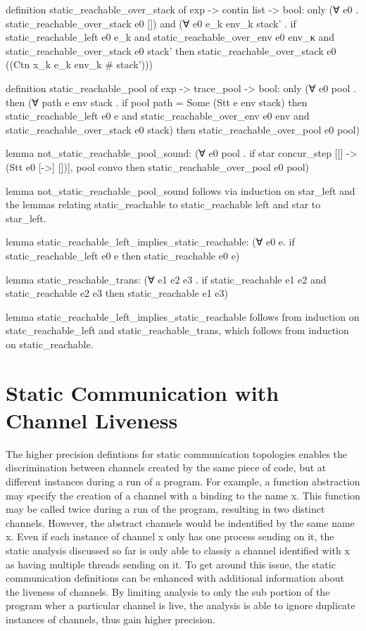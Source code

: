 definition static_reachable_over_stack of exp -> contin list -> bool:
only
(∀ e0 .
  static_reachable_over_stack e0 []) and
(∀ e0 e_k env_k stack' .
  if
    static_reachable_left e0 e_k and 
    static_reachable_over_env e0 env_κ and
    static_reachable_over_stack e0 stack' 
  then
    static_reachable_over_stack e0 ((Ctn x_k e_k env_k # stack')))

definition static_reachable_pool of exp -> trace_pool -> bool:
only
(∀ e0 pool .
  then
    (∀ path e env stack . if pool path = Some (Stt e env stack) then 
      static_reachable_left e0 e and 
      static_reachable_over_env e0 env and 
      static_reachable_over_stack e0 stack)
   then
    static_reachable_over_pool e0 pool)


lemma not_static_reachable_pool_sound:
(∀ e0 pool .
  if
    star concur_step [[] -> (Stt e0 [->] [])], {} pool convo 
  then
    static_reachable_over_pool e0 pool)


lemma not_static_reachable_pool_sound follows via induction on star_left and the lemmas
relating static_reachable to static_reachable left and star to star_left.


lemma static_reachable_left_implies_static_reachable:
(∀ e0 e. 
  if
    static_reachable_left e0 e
  then
    static_reachable e0 e)

lemma static_reachable_trans:
(∀ e1 e2 e3 .
  if 
    static_reachable e1 e2 and
    static_reachable e2 e3
  then
    static_reachable e1 e3)


lemma static_reachable_left_implies_static_reachable follows from induction on
statc_reachable_left and static_reachable_trans, which follows from induction on
static_reachable.



\section{Static Communication with Channel Liveness }

The higher precision defintions for static communication topologies enables the discrimination
between channels created by the same piece of code, but at different instances during a run of
a program.  For example, a function abstraction may specify the creation of a channel with a
binding to the name x.  This function may be called twice during a run of the program,
resulting in two distinct channels.  However, the abstract channels would be indentified by the
same name x.  Even if each instance of channel x only has one process sending on it, the static
analysis discussed so far is only able to classiy a channel identified with x as having multiple
threads sending on it. To get around this issue, the static communication definitions can be
enhanced with additional information about the liveness of channels.  By limiting analysis to only
the sub portion of the program wher a particular channel is live, the analysis is able to ignore
duplicate instances of channels, thus gain higher precision. 

